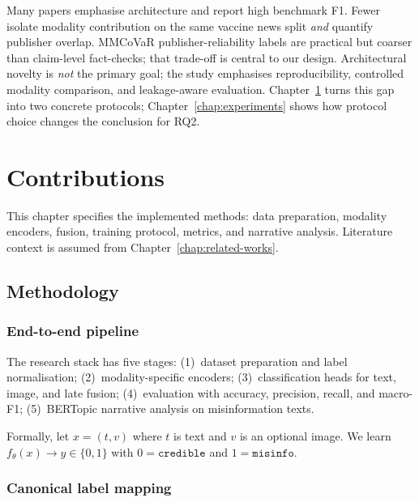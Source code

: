 \documentclass[12pt, a4paper]{report}
\begin{document}
Many papers emphasise architecture and report high benchmark F1.
Fewer isolate modality contribution on the same vaccine news split \emph{and} quantify publisher overlap.
MMCoVaR publisher-reliability labels are practical but coarser than claim-level fact-checks; that trade-off is central to our design.
Architectural novelty is \emph{not} the primary goal; the study emphasises reproducibility, controlled modality comparison, and leakage-aware evaluation.
Chapter~\ref{chap:contribution} turns this gap into two concrete protocols; Chapter~\ref{chap:experiments} shows how protocol choice changes the conclusion for RQ2.


\chapter{Contributions}
\label{chap:contribution}

This chapter specifies the implemented methods: data preparation, modality encoders, fusion, training protocol, metrics, and narrative analysis.
Literature context is assumed from Chapter~\ref{chap:related-works}.

\section{Methodology}
\label{sec:methodology}

\subsection{End-to-end pipeline}

The research stack has five stages:
(1)~dataset preparation and label normalisation;
(2)~modality-specific encoders;
(3)~classification heads for text, image, and late fusion;
(4)~evaluation with accuracy, precision, recall, and macro-F1;
(5)~BERTopic narrative analysis on misinformation texts.

Formally, let $x = (t, v)$ where $t$ is text and $v$ is an optional image.
We learn $f_\theta(x) \rightarrow y \in \{0,1\}$ with $0=\texttt{credible}$ and $1=\texttt{misinfo}$.

\subsection{Canonical label mapping}
\end{document}
